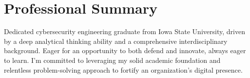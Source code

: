 
\section{Professional Summary}


\noindent Dedicated cybersecurity engineering graduate from Iowa State University, driven by a deep analytical thinking ability and a comprehensive interdisciplinary background. Eager for an opportunity to both defend and innovate, always eager to learn. I'm committed to leveraging my solid academic foundation and relentless problem-solving approach to fortify an organization's digital presence.